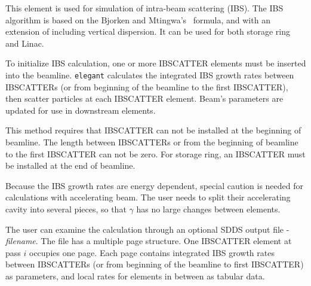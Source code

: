 This element is used for simulation of intra-beam scattering
(IBS). The IBS algorithm is based on the Bjorken and
Mtingwa's~\cite{BM} formula, and with an extension of including
vertical dispersion. It can be used for both storage ring and Linac.

To initialize IBS calculation, one or more IBSCATTER elements must be
inserted into the beamline. {\tt elegant} calculates the integrated
IBS growth rates between IBSCATTERs (or from beginning of the beamline
to the first IBSCATTER), then scatter particles at each IBSCATTER
element. Beam's parameters are updated for use in downstream elements.

This method requires that IBSCATTER can not be installed at the beginning
of beamline. The length between IBSCATTERs or from the beginning of
beamline to the first IBSCATTER can not be zero. For storage ring, an
IBSCATTER must be installed at the end of beamline.

Because the IBS growth rates are energy dependent, special caution is
needed for calculations with accelerating beam. The user needs to
split their accelerating cavity into several pieces, so that $\gamma$
has no large changes between elements.

The user can examine the calculation through an optional SDDS output
file - {\it filename}. The file has a multiple page structure. One
IBSCATTER element at pass $i$ occupies one page. Each page contains
integrated IBS growth rates between IBSCATTERs (or from beginning of
the beamline to first IBSCATTER) as parameters, and local rates for
elements in between as tabular data.
